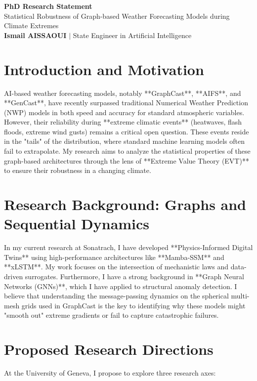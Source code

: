\documentclass[11pt,a4paper]{article}
\begin{document}
\begin{center}
    {\LARGE\bfseries\color{titleblue} PhD Research Statement}\\[6pt]
    {\large Statistical Robustness of Graph-based Weather Forecasting Models during Climate Extremes}\\[4pt]
    \textbf{Ismail AISSAOUI} $|$ State Engineer in Artificial Intelligence
\end{center}

\bigskip

\section{Introduction and Motivation}
AI-based weather forecasting models, notably **GraphCast**, **AIFS**, and **GenCast**, have recently surpassed traditional Numerical Weather Prediction (NWP) models in both speed and accuracy for standard atmospheric variables. However, their reliability during **extreme climatic events** (heatwaves, flash floods, extreme wind gusts) remains a critical open question. These events reside in the "tails" of the distribution, where standard machine learning models often fail to extrapolate. My research aims to analyze the statistical properties of these graph-based architectures through the lens of **Extreme Value Theory (EVT)** to ensure their robustness in a changing climate.

\section{Research Background: Graphs and Sequential Dynamics}
In my current research at Sonatrach, I have developed **Physics-Informed Digital Twins** using high-performance architectures like **Mamba-SSM** and **xLSTM**. My work focuses on the intersection of mechanistic laws and data-driven surrogates. Furthermore, I have a strong background in **Graph Neural Networks (GNNs)**, which I have applied to structural anomaly detection. I believe that understanding the message-passing dynamics on the spherical multi-mesh grids used in GraphCast is the key to identifying why these models might "smooth out" extreme gradients or fail to capture catastrophic failures.

\section{Proposed Research Directions}
At the University of Geneva, I propose to explore three research axes:
\end{document}
